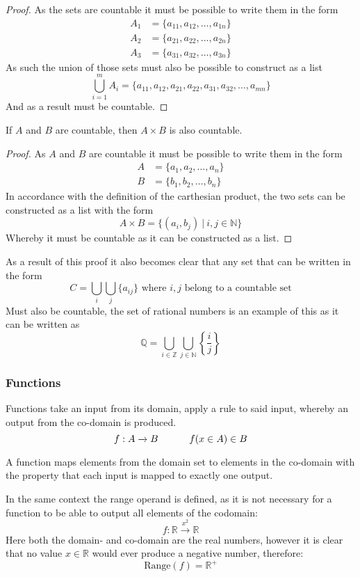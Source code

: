 \begin{proof}
  As the sets are countable it must be possible to write them in the form
  \begin{align*}
      A_1&=\{a_{11},a_{12},\ldots,a_{1n}\} \\
      A_2&=\{a_{21},a_{22},\ldots,a_{2n}\} \\
      A_3&=\{a_{31},a_{32},\ldots,a_{3n}\}
  \end{align*}
  As such the union of those sets must also be possible to construct as a list
  \[
      \bigcup_{i=1}^{m}A_{i}=\{a_{11},a_{12},a_{21},a_{22},a_{31},a_{32},\ldots,a_{mn}\}
  \]
  And as a result must be countable.
\end{proof}
\begin{theorem}
  If $A$ and $B$ are countable, then $A\times B$ is also countable.
\end{theorem}
\begin{proof}
  As $A$ and $B$ are countable it must be possible to write them in the form
  \begin{align*}
      A&=\{a_{1},a_{2},\ldots,a_{n}\} \\
      B&=\{b_{1},b_{2},\ldots,b_{n}\}
  \end{align*}
  In accordance with the definition of the carthesian product, the two sets can be constructed as a list with the form
  \[
      A\times B=\{(a_{i},b_{j})~|~i,j\in \mathbb{N}\}
  \]
  Whereby it must be countable as it can be constructed as a list.
\end{proof}
As a result of this proof it also becomes clear that any set that can be written in the form
\[
    C=\bigcup_{i}\bigcup_{j}\{a_{ij}\}\text{ where }i,j \text{ belong to a countable set}
\]
Must also be countable, the set of rational numbers is an example of this as it can be written as
\[
    \mathbb{Q}=\bigcup_{i\in \mathbb{Z}}\bigcup_{j\in \mathbb{N}}\left\{\frac{i}{j}\right\}
\]
\subsubsection{Functions}
Functions take an input from its domain, apply a rule to said input, whereby an output from the co-domain is produced.
\[
    f:A\xrightarrow{} B\hskip 32pt f(x\in A)\in B
\]
\begin{definition}
  A function maps elements from the domain set to elements in the co-domain with the property that each input is mapped to exactly one output.
\end{definition}
In the same context the range operand is defined, as it is not necessary for a function to be able to output all elements of the codomain:
\[
    f: \mathbb{R} \xrightarrow{x^{2}} \mathbb{R}
\]
Here both the domain- and co-domain are the real numbers, however it is clear that no value $x\in \mathbb{R}$ would ever produce a negative number, therefore:
\[
    \text{Range}(f)=\mathbb{R}^{+}
\]
